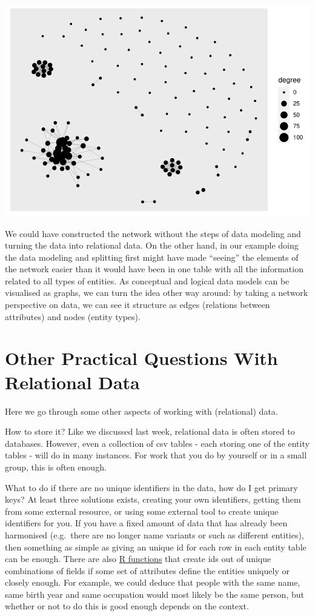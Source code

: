\documentclass[
]{book}
\begin{document}
\includegraphics{_main_files/figure-latex/unnamed-chunk-79-1.pdf}

We could have constructed the network without the steps of data modeling and turning the data into relational data. On the other hand,
in our example doing the data modeling and splitting first might have made ``seeing'' the elements of the network easier than
it would have been in one table with all the information related to all types of entities. As conceptual and logical data models can be visualised as graphs, we can turn the idea other way around: by taking a network perspective on data, we can see it structure as edges (relations between attributes) and nodes (entity types).

\hypertarget{other-practical-questions-with-relational-data}{%
\section{Other Practical Questions With Relational Data}\label{other-practical-questions-with-relational-data}}

Here we go through some other aspects of working with (relational) data.

How to store it? Like we discussed last week, relational data is often stored to databases. However, even a collection of csv tables - each storing one of the entity tables - will do in many instances. For work that you do by yourself or in a small group, this is often enough.

What to do if there are no unique identifiers in the data, how do I get primary keys? At least three solutions exists, creating your own identifiers, getting them from some external resource, or using some external tool to create unique identifiers for you. If you have a fixed amount of data that has already been harmonised (e.g.~there are no longer name variants or such as different entities), then something as simple as giving an unique id for each row in each entity table can be enough. There are also \href{https://www.rdocumentation.org/packages/udpipe/versions/0.5/topics/unique_identifier}{R functions} that create ids out of unique combinations of fields if some set of attributes define the entities uniquely or closely enough. For example, we could deduce that people with the same name, same birth year and same occupation would most likely be the same person, but whether or not to do this is good enough depends on the context.
\end{document}
